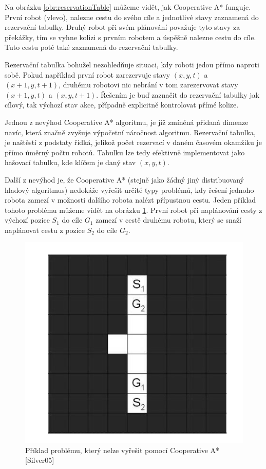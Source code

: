 Na obrázku \ref{obr:reservationTable} můžeme vidět, jak Cooperative A* funguje. První robot (vlevo), nalezne cestu do svého cíle a jednotlivé stavy zaznamená do rezervační tabulky. Druhý robot při svém plánování považuje tyto stavy za překážky, tím se vyhne kolizi s prvním robotem a úspěšně nalezne cestu do cíle. Tuto cestu poté také zaznamená do rezervační tabulky.

Rezervační tabulka bohužel nezohledňuje situaci, kdy roboti jedou přímo naproti sobě. Pokud například první robot zarezervuje stavy $\left(x,y,t\right)$ a $\left(x+1,y,t+1\right)$, druhému robotovi nic nebrání v tom zarezervovat stavy $\left(x+1,y,t\right)$ a $\left(x,y,t+1\right)$. Řešením je buď zaznačit do rezervační tabulky jak cílový, tak výchozí stav akce, případně explicitně kontrolovat přímé kolize.

Jednou z nevýhod Cooperative A* algoritmu, je již zmíněná přidaná dimenze navíc, která značně zvyšuje výpočetní náročnost algoritmu. Rezervační tabulka, je naštěstí z podstaty řídká, jelikož počet rezervací v daném časovém okamžiku je přímo úměrný počtu robotů. Tabulku lze tedy efektivně implementovat jako hašovací tabulku, kde klíčem je daný stav $\left(x,y,t\right)$.

Další z nevýhod je, že Cooperative A* (stejně jako žádný jiný distribuovaný hladový algoritmus) nedokáže vyřešit určité typy problémů, kdy řešení jednoho robota zamezí v možnosti dalšího robota nalézt přípustnou cestu. Jeden příklad tohoto problému můžeme vidět na obrázku \ref{obr:unsolvableCoopProblem}. První robot při naplánování cesty z výchozí pozice $S_1$ do cíle $G_1$ zamezí v cestě druhému robotu, který se snaží naplánovat cestu z pozice $S_2$ do cíle $G_2$.

\begin{figure}[!h]
	\begin{center}
		\includegraphics*[scale=0.5]{obr/unsolvableCoopProblem}
	\end{center}
	\caption[caption]{Příklad problému, který nelze vyřešit pomocí Cooperative A* [Silver05]}
	\label{obr:unsolvableCoopProblem}
\end{figure}

